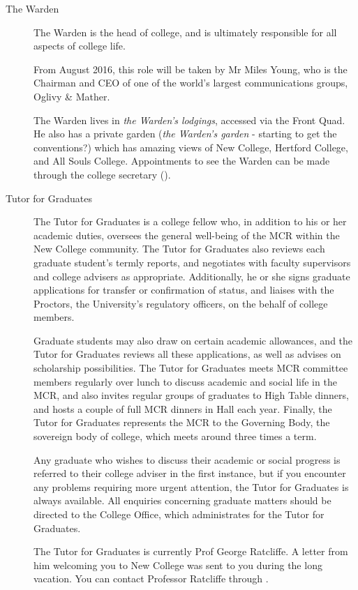 \begin{description}

\item[The Warden]
The Warden is the head of college, and is ultimately responsible for all aspects of college life. 

From August 2016, this role will be taken by Mr Miles Young, who is the Chairman and CEO of one of the world's largest communications groups, Oglivy \& Mather.

The Warden lives in \emph{the Warden's lodgings}, accessed via the Front Quad.
He also has a private garden (\emph{the Warden's garden} - starting to get the
conventions?) which has amazing views of New College, Hertford College, and All Souls College.
Appointments to see the Warden can be made through the college secretary (\href{mailto:warden@new.ox.ac.uk}{}).

\item[Tutor for Graduates]
The Tutor for Graduates is a college fellow who, in addition to his or her academic duties, oversees the general well-being of the MCR within the New College community. The Tutor for Graduates also reviews each graduate student's termly reports, and negotiates with faculty supervisors and college advisers as appropriate. Additionally, he or she signs graduate applications for transfer or confirmation of status, and liaises with the Proctors, the University's regulatory officers, on the behalf of college members.

Graduate students may also draw on certain academic allowances, and the Tutor for Graduates reviews all these applications, as well as advises on scholarship possibilities. The Tutor for Graduates meets MCR committee members regularly over lunch to discuss academic and social life in the MCR, and also invites regular groups of graduates to High Table dinners, and hosts a couple of full MCR dinners in Hall each year. Finally, the Tutor for Graduates represents the MCR to the Governing Body, the sovereign body of college, which meets around three times a term. 

Any graduate who wishes to discuss their academic or social progress is referred to their college adviser in the first instance, but if you encounter any problems requiring more urgent attention, the Tutor for Graduates is always available. All enquiries concerning graduate matters should be directed to the College Office, which administrates for the Tutor for Graduates.

The Tutor for Graduates is currently Prof George Ratcliffe. A letter from him
welcoming you to New College was sent to you during the long vacation. You can
contact Professor Ratcliffe through 
\href{mailto:george.ratcliffe@new.ox.ac.uk}{}.


\end{description}
